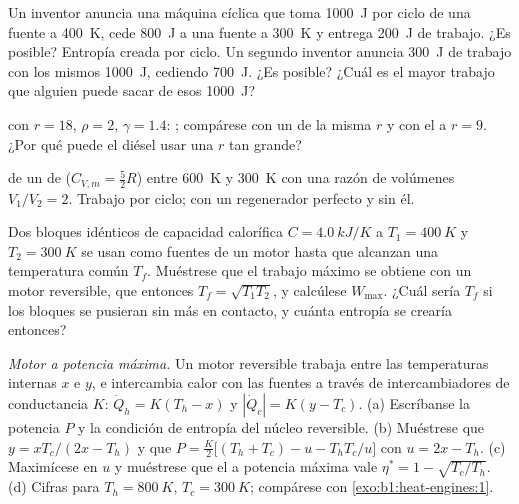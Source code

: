 \begin{exercise}[$\star\star$]\label{exo:b1:heat-engines:6}
Un inventor anuncia una máquina cíclica que toma \qty{1000}{J} por ciclo
de una fuente a \qty{400}{K}, cede \qty{800}{J} a una fuente a
\qty{300}{K} y entrega \qty{200}{J} de trabajo. ¿Es posible? Entropía creada
por ciclo. Un segundo inventor anuncia \qty{300}{J} de trabajo con los
mismos \qty{1000}{J}, cediendo \qty{700}{J}. ¿Es posible? ¿Cuál es el mayor
trabajo que alguien puede sacar de esos \qty{1000}{J}?
\end{exercise}

\begin{exercise}[$\star\star$]\label{exo:b1:heat-engines:7}
 con $r = 18$, $\rho = 2$, $\gamma = 1.4$: ;
compárese con un  de la misma $r$ y con el  a
$r = 9$. ¿Por qué puede el diésel usar una $r$ tan grande?
\end{exercise}

\begin{exercise}[$\star\star$]\label{exo:b1:heat-engines:8}
 de un  de  ($C_{V,m} = \tfrac52R$) entre
\qty{600}{K} y \qty{300}{K} con una razón de volúmenes $V_1/V_2 = 2$.
Trabajo por ciclo;  con un regenerador perfecto y sin él.
\end{exercise}

\begin{exercise}[$\star\star$]\label{exo:b1:heat-engines:9}
Dos bloques idénticos de capacidad calorífica $C = \qty{4.0}{kJ/K}$ a $T_1 =
\qty{400}{K}$ y $T_2 = \qty{300}{K}$ se usan como fuentes de un motor
hasta que alcanzan una temperatura común $T_f$. Muéstrese que el trabajo
máximo se obtiene con un motor reversible, que entonces $T_f = \sqrt{T_1T_2}$, y
calcúlese $W_{\max}$. ¿Cuál sería $T_f$ si los bloques se pusieran sin más
en contacto, y cuánta entropía se crearía entonces?
\end{exercise}

\begin{exercise}[$\star\star\star$]\label{exo:b1:heat-engines:10}
\emph{Motor a potencia máxima.} Un motor reversible trabaja entre las
temperaturas internas $x$ e $y$, e intercambia calor con las fuentes a
través de intercambiadores de conductancia $K$: $\dot Q_h = K(T_h - x)$ y
$|\dot Q_c| = K(y - T_c)$. (a) Escríbanse la potencia $P$ y la condición de
entropía del núcleo reversible. (b) Muéstrese que $y = xT_c/(2x - T_h)$ y
que $P = \frac{K}{2}\bigl[(T_h + T_c) - u - T_hT_c/u\bigr]$ con $u = 2x - T_h$.
(c) Maximícese en $u$ y muéstrese que el  a potencia máxima
vale $\eta^\ast = 1 - \sqrt{T_c/T_h}$. (d) Cifras para $T_h = \qty{800}{K}$,
$T_c = \qty{300}{K}$; compárese con \cref{exo:b1:heat-engines:1}.
\end{exercise}

